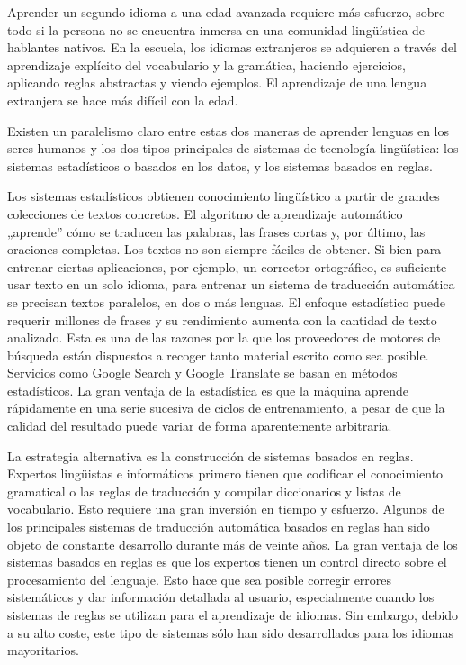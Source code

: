 \begin{multicols}{2}
Aprender un segundo idioma a una edad avanzada requiere más esfuerzo, sobre todo si la persona no se encuentra inmersa en una comunidad lingüística de hablantes nativos. En la escuela, los idiomas extranjeros se adquieren a través del aprendizaje explícito del vocabulario y la gramática, haciendo ejercicios, aplicando reglas abstractas y viendo ejemplos. El aprendizaje de una lengua extranjera se hace más difícil con la edad. 

Existen un paralelismo claro entre estas dos maneras de aprender lenguas en los seres humanos y los dos tipos principales de sistemas de tecnología lingüística: los sistemas estadísticos o basados en los datos, y los sistemas basados en reglas.  

Los sistemas estadísticos obtienen conocimiento lingüístico a partir de grandes colecciones de textos concretos. El algoritmo de aprendizaje automático „aprende” cómo se traducen las palabras, las frases cortas y, por último, las oraciones completas. Los textos no son siempre fáciles de obtener. Si bien para entrenar ciertas aplicaciones, por ejemplo, un corrector ortográfico, es suficiente usar texto en un solo idioma, para entrenar un sistema de traducción automática se precisan  textos paralelos, en dos o más lenguas. El enfoque estadístico puede requerir millones de frases y su rendimiento aumenta con la cantidad de texto analizado. Esta es una de las razones por la que los proveedores de motores de búsqueda están dispuestos a recoger tanto material escrito como sea posible. Servicios como Google Search y Google Translate se basan en métodos estadísticos. La gran ventaja de la estadística es que la máquina aprende rápidamente en una serie sucesiva de ciclos de entrenamiento, a pesar de que la calidad del resultado puede variar de forma aparentemente arbitraria.

La estrategia alternativa es la construcción de sistemas basados en reglas. Expertos lingüistas e informáticos primero tienen que codificar el conocimiento gramatical o las reglas de traducción y compilar diccionarios y listas de vocabulario. Esto requiere una gran inversión en tiempo y esfuerzo. Algunos de los principales sistemas de traducción automática basados en reglas han sido objeto de constante desarrollo durante más de veinte años. La gran ventaja de los sistemas basados en reglas es que los expertos tienen un control directo sobre el procesamiento del lenguaje. Esto hace que sea posible corregir errores sistemáticos y dar información detallada al usuario, especialmente cuando los sistemas de reglas se utilizan para el aprendizaje de idiomas. Sin embargo, debido a su alto coste, este tipo de sistemas sólo han sido desarrollados para los idiomas mayoritarios.


\end{multicols}
